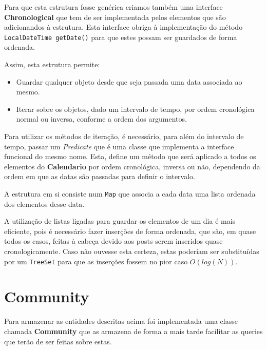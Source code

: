 \documentclass[10pt,a4paper]{report}
\begin{document}
        Para que esta estrutura fosse genérica criamos também uma interface
        \textbf{Chronological} que tem de ser implementada pelos elementos
        que são adicionandos à estrutura. Esta interface obriga à implementação
        do método \texttt{LocalDateTime getDate()} para que estes
        possam ser guardados de forma ordenada.

        Assim, esta estrutura permite:
        \begin{itemize}
                \item Guardar qualquer objeto desde que seja
                      passada uma data associada ao mesmo.
                \item Iterar sobre os objetos, dado um intervalo de tempo,
                      por ordem cronológica normal ou inversa, conforme a
                      ordem dos argumentos.
        \end{itemize}

        Para utilizar os métodos de iteração, é necessário, para além do
        intervalo de tempo, passar um \textit{Predicate} que é uma classe que
        implementa a interface funcional do mesmo nome. Esta, define um método
        que será aplicado a todos os elementos do \textbf{Calendario} por ordem
        cronológica, inversa ou não, dependendo da ordem em que as datas são
        passadas para definir o intervalo.

        A estrutura em si consiste num \texttt{Map} que associa a cada
        data uma lista ordenada dos elementos desse data.

        A utilização de listas ligadas para guardar os elementos de um dia é
        mais eficiente, pois é necessário fazer inserções de forma ordenada,
        que são, em quase todos os casos, feitas à cabeça devido aos posts serem
        inseridos quase cronologicamente. Caso não ouvesse esta certeza, estas
        poderiam ser substituídas por um \texttt{TreeSet} para que
        as inserções fossem no pior caso $O(log(N))$.

    \section{Community}
    Para armazenar as entidades descritas acima foi implementada uma classe
    chamada \textbf{Community} que as armazena de forma a mais tarde facilitar
    as queries que terão de ser feitas sobre estas.
\end{document}
